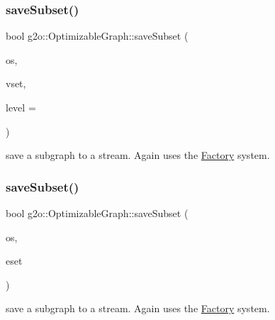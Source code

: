 \subsubsection{\texorpdfstring{save\+Subset()}{saveSubset()}\hspace{0.1cm}{\footnotesize\ttfamily [1/2]}}
{\footnotesize\ttfamily bool g2o\+::\+Optimizable\+Graph\+::save\+Subset (\begin{DoxyParamCaption}\item[{std\+::ostream \&}]{os,  }\item[{\mbox{\hyperlink{classg2o_1_1_hyper_graph_a703938cdb4bb636860eed55a2489d70c}{Hyper\+Graph\+::\+Vertex\+Set}} \&}]{vset,  }\item[{int}]{level = {} }\end{DoxyParamCaption})}



save a subgraph to a stream. Again uses the \mbox{\hyperlink{classg2o_1_1_factory}{Factory}} system. 

\mbox{\label{structg2o_1_1_optimizable_graph_a2a08383ab953d435eaaca6231b64c3b6}} 
\subsubsection{\texorpdfstring{save\+Subset()}{saveSubset()}\hspace{0.1cm}{\footnotesize\ttfamily [2/2]}}
{\footnotesize\ttfamily bool g2o\+::\+Optimizable\+Graph\+::save\+Subset (\begin{DoxyParamCaption}\item[{std\+::ostream \&}]{os,  }\item[{\mbox{\hyperlink{classg2o_1_1_hyper_graph_a5e2970e236c0dcb4eff7c205d7b6b4ae}{Hyper\+Graph\+::\+Edge\+Set}} \&}]{eset }\end{DoxyParamCaption})}



save a subgraph to a stream. Again uses the \mbox{\hyperlink{classg2o_1_1_factory}{Factory}} system. 

\mbox{\label{structg2o_1_1_optimizable_graph_a221656c91e253b4246553a33e33c3e6b}} 
